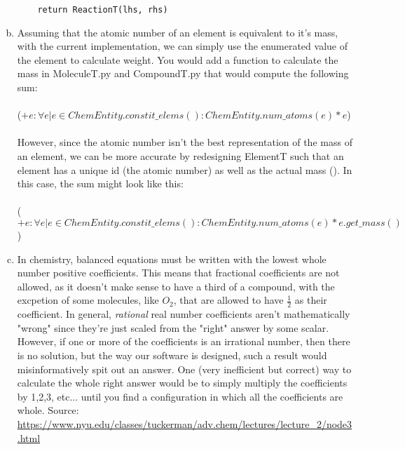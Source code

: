 \documentclass[12pt]{article}
\begin{document}
\begin{enumerate}[a)]
\begin{lstlisting}
    return ReactionT(lhs, rhs)
\end{lstlisting}

\item Assuming that the atomic number of an element is equivalent to it's mass, with the current implementation, we can simply use the enumerated value of the element to calculate weight. You would add a function to calculate the mass in MoleculeT.py and CompoundT.py that would compute the following sum:\\\\
($+e : \forall e | e \in ChemEntity.constit\_elems() : ChemEntity.num\_atoms(e) * e$)
\\\\
However, since the atomic number isn't the best representation of the mass of an element, we can be more accurate by redesigning ElementT such that an element has a unique id (the atomic number) as well as the actual mass (). In this case, the sum might look like this:\\\\
($+e : \forall e | e \in ChemEntity.constit\_elems() : ChemEntity.num\_atoms(e) * e.get\_mass()$)
\\

\item In chemistry, balanced equations must be written with the lowest whole number positive coefficients. This means that fractional coefficients are not allowed, as it doesn't make sense to have a third of a compound, with the excpetion of some molecules, like $O_2$, that are allowed to have $\frac{1}{2}$ as their coefficient. In general, \emph{rational} real number coefficients aren't mathematically "wrong" since they're just scaled from the "right" answer by some scalar. However, if one or more of the coefficients is an irrational number, then there is no solution, but the way our software is designed, such a result would misinformatively spit out an answer. One (very inefficient but correct) way to calculate the whole right answer would be to simply multiply the coefficients by 1,2,3, etc... until you find a configuration in which all the coefficients are whole. Source: \url{https://www.nyu.edu/classes/tuckerman/adv.chem/lectures/lecture_2/node3.html}


\end{enumerate}
\end{document}
